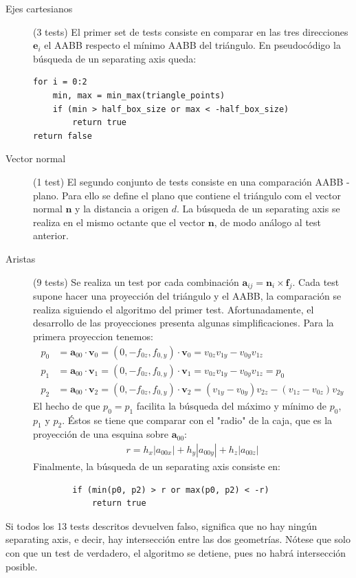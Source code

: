 \begin{description}
    \item[Ejes cartesianos] (3 tests) El primer set de tests consiste en comparar en las tres direcciones $\mathbf{e}_i$ el AABB respecto el mínimo AABB del triángulo. En pseudocódigo la búsqueda de un separating axis queda:
    \begin{verbatim}
for i = 0:2
    min, max = min_max(triangle_points)
    if (min > half_box_size or max < -half_box_size)
        return true
return false
    \end{verbatim} 
    \item[Vector normal] (1 test) El segundo conjunto de tests consiste en una comparación AABB - plano. Para ello se define el plano que contiene el triángulo com el vector normal $\mathbf{n}$ y la distancia a origen $d$. La búsqueda de un separating axis se realiza en el mismo octante que el vector $\mathbf{n}$, de modo análogo al test anterior.
    \item[Aristas] (9 tests) Se realiza un test por cada combinación $\mathbf{a}_{ij} = \mathbf{n}_i \times \mathbf{f}_j$. Cada test supone hacer una proyección del triángulo y el AABB, la comparación se realiza siguiendo el algoritmo del primer test. Afortunadamente, el desarrollo de las proyecciones presenta algunas simplificaciones. Para la primera proyeccion tenemos:
    \begin{align*}
        p_0 &= \mathbf{a}_{00} \cdot \mathbf{v}_0 = (0, -f_{0z}, f_{0,y}) \cdot \mathbf{v}_0 = v_{0z}v_{1y} - v_{0y}v_{1z} \\
        p_1 &= \mathbf{a}_{00} \cdot \mathbf{v}_1 = (0, -f_{0z}, f_{0,y}) \cdot \mathbf{v}_1 = v_{0z}v_{1y} - v_{0y}v_{1z} = p_0 \\
        p_2 &= \mathbf{a}_{00} \cdot \mathbf{v}_2 = (0, -f_{0z}, f_{0,y}) \cdot \mathbf{v}_2 = (v_{1y} - v_{0y}) v_{2z} - (v_{1z} - v_{0z}) v_{2y}
    \end{align*}
    El hecho de que $p_0 = p_1$ facilita la búsqueda del máximo y mínimo de $p_0$, $p_1$ y $p_2$. Éstos se tiene que comparar con el "radio" de la caja, que es la proyección de una esquina sobre $\mathbf{a}_{00}$:
    \begin{align*}
        r = h_x |a_{00x}| + h_y |a_{00y}| + h_z |a_{00z}|
    \end{align*}
    Finalmente, la búsqueda de un separating axis consiste en:
    \begin{verbatim}
        if (min(p0, p2) > r or max(p0, p2) < -r)
            return true
    \end{verbatim}
\end{description}
Si todos los 13 tests descritos devuelven falso, significa que no hay ningún separating axis, e decir, hay intersección entre las dos geometrías. Nótese que solo con que un test de verdadero, el algoritmo se detiene, pues no habrá intersección posible.

